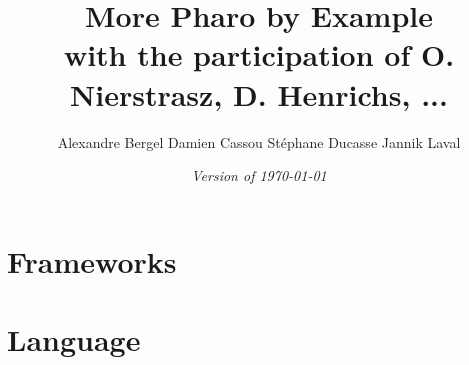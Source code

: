 \documentclass[a4paper,10pt,twoside]{book}
\begin{document}
\frontmatter
\setcounter{page}{1}
\pagestyle{headings}
\author{
	Alexandre Bergel\quad
	Damien Cassou\quad
	St\'ephane Ducasse\quad
	Jannik Laval\quad}
\title{\Huge\bf More Pharo by Example\\[1ex]
\small with the participation of O. Nierstrasz, D. Henrichs, ... }
\isodate
\date{\emph{Version of \today}}
\maketitle
\tableofcontents
\sloppy %
\mainmatter


\part{Frameworks}

%





\part{Language}




\end{document}
